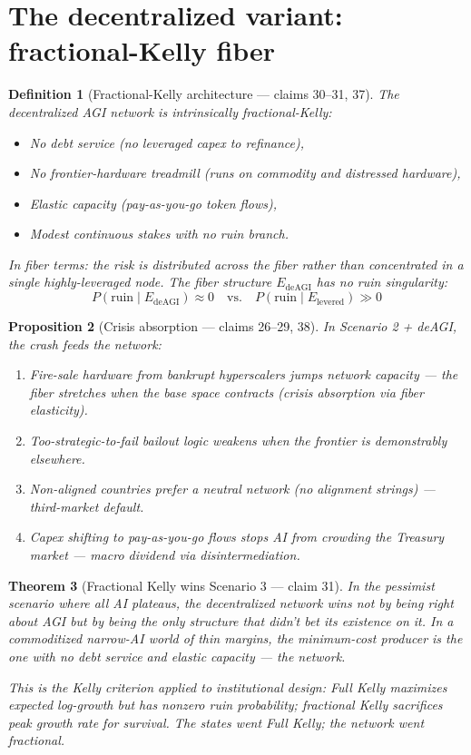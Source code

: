 \documentclass[11pt,a4paper]{article}
\newtheorem{definition}{Definition}[section]
\newtheorem{theorem}[definition]{Theorem}
\newtheorem{proposition}[definition]{Proposition}
\begin{document}
\section{The decentralized variant: fractional-Kelly fiber}
\label{sec:deagi}

\begin{definition}[Fractional-Kelly architecture --- claims 30--31, 37]
\label{def:kelly}
The decentralized AGI network is intrinsically fractional-Kelly:
\begin{itemize}
\item No debt service (no leveraged capex to refinance),
\item No frontier-hardware treadmill (runs on commodity and distressed
  hardware),
\item Elastic capacity (pay-as-you-go token flows),
\item Modest continuous stakes with no ruin branch.
\end{itemize}
In fiber terms: the risk is distributed across the fiber rather than
concentrated in a single highly-leveraged node. The fiber structure
$E_{\text{deAGI}}$ has no ruin singularity:
\[
  P(\text{ruin} \mid E_{\text{deAGI}}) \approx 0
  \quad\text{vs.}\quad
  P(\text{ruin} \mid E_{\text{levered}}) \gg 0
\]
\end{definition}

\begin{proposition}[Crisis absorption --- claims 26--29, 38]
\label{prop:absorption}
In Scenario 2 + deAGI, the crash feeds the network:
\begin{enumerate}
\item Fire-sale hardware from bankrupt hyperscalers jumps network
  capacity --- the fiber stretches when the base space contracts
  (crisis absorption via fiber elasticity).
\item Too-strategic-to-fail bailout logic weakens when the frontier
  is demonstrably elsewhere.
\item Non-aligned countries prefer a neutral network (no alignment
  strings) --- third-market default.
\item Capex shifting to pay-as-you-go flows stops AI from crowding
  the Treasury market --- macro dividend via disintermediation.
\end{enumerate}
\end{proposition}

\begin{theorem}[Fractional Kelly wins Scenario 3 --- claim 31]
\label{thm:kelly}
In the pessimist scenario where all AI plateaus, the decentralized
network wins not by being right about AGI but by being the only
structure that didn't bet its existence on it. In a commoditized
narrow-AI world of thin margins, the minimum-cost producer is the
one with no debt service and elastic capacity --- the network.

This is the Kelly criterion applied to institutional design:
Full Kelly maximizes expected log-growth but has nonzero ruin
probability; fractional Kelly sacrifices peak growth rate for
survival. The states went Full Kelly; the network went fractional.
\end{theorem}
\end{document}
